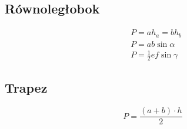 \documentclass{article}
\numberwithin{equation}{section}
\begin{document}
    \subsection{Równoległobok}
      \begin{align}
        &P = ah_a = bh_b\\
        &P = ab\sin\alpha\\
        &P = \frac 12ef\sin\gamma
      \end{align}
    \subsection{Trapez}
      \begin{equation}
        P = \frac{(a+b)\cdot h}{2}
      \end{equation}
\end{document}
